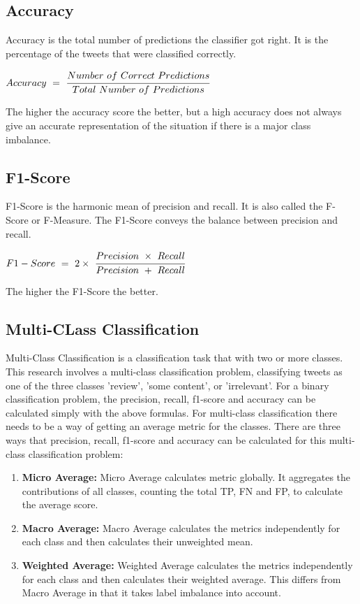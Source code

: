 \subsection*{Accuracy}
Accuracy is the total number of predictions the classifier got right. It is the percentage of the tweets that were classified correctly.
\begin{center}
    $Accuracy\ =\ \cfrac{Number\ of\ Correct\ Predictions}{Total\ Number\ of\ Predictions}$
\end{center}
The higher the accuracy score the better, but a high accuracy does not always give an accurate representation of the situation if there is a major class imbalance.

\subsection*{F1-Score}
F1-Score is the harmonic mean of precision and recall. It is also called the F-Score or F-Measure. The F1-Score conveys the balance between precision and recall.
\begin{center}
    $F1-Score\ =\ 2 \times\ \cfrac{Precision\ \times\ Recall}{Precision\ +\ Recall}$
\end{center}
The higher the F1-Score the better.

\subsection*{Multi-CLass Classification}
Multi-Class Classification is a classification task that with two or more classes. This research involves a multi-class classification problem, classifying tweets as one of the three  classes 'review', 'some content', or 'irrelevant'. For a binary classification problem, the precision, recall, f1-score and accuracy can be calculated simply with the above formulas. For multi-class classification there needs to be a way of getting an average metric for the classes.
There are three ways that precision, recall, f1-score and accuracy can be calculated for this multi-class classification problem:
\begin{enumerate}
    \item \textbf{Micro Average:}\newline
    Micro Average calculates metric globally. It aggregates the contributions of all classes, counting the total TP, FN and FP, to calculate the average score.  
    \item \textbf{Macro Average:}\newline
    Macro Average calculates the metrics independently for each class and then calculates their unweighted mean.
    \item \textbf{Weighted Average:}\newline
    Weighted Average calculates the metrics independently for each class and then calculates their weighted average. This differs from Macro Average in that it takes label imbalance into account. 
\end{enumerate}

